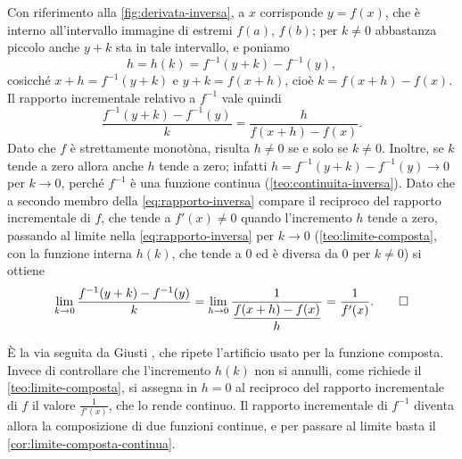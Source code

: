 \begin{dimostrazione}
Con riferimento alla \cref{fig:derivata-inversa}, a $x$ corrisponde $y=f(x)$, che è
interno all'intervallo immagine di estremi $f(a)$, $f(b)$; per $k\neq0$ abbastanza
piccolo anche $y+k$ sta in tale intervallo, e poniamo
\[
  h=h(k)=f^{-1}(y+k)-f^{-1}(y),
\]
cosicché $x+h=f^{-1}(y+k)$ e $y+k=f(x+h)$, cioè $k=f(x+h)-f(x)$. Il rapporto incrementale
relativo a $f^{-1}$ vale quindi
\begin{equation}\label{eq:rapporto-inversa}
  \frac{f^{-1}(y+k)-f^{-1}(y)}{k}=\frac{h}{f(x+h)-f(x)} .
\end{equation}
Dato che $f$ è strettamente monotòna, risulta $h\neq0$ se e solo se $k\neq0$. Inoltre, se
$k$ tende a zero allora anche $h$ tende a zero; infatti
$h=f^{-1}(y+k)-f^{-1}(y)\to0$ per $k\to0$, perché $f^{-1}$ è una funzione continua
(\cref{teo:continuita-inversa}). Dato che a secondo membro della
\eqref{eq:rapporto-inversa} compare il reciproco del rapporto incrementale di $f$, che
tende a $f'(x)\neq0$ quando l'incremento $h$ tende a zero, passando al limite nella
\eqref{eq:rapporto-inversa} per $k\to0$ (\cref{teo:limite-composta}, con la funzione
interna $h(k)$, che tende a $0$ ed è diversa da $0$ per $k\neq0$) si ottiene
\[
  \lim_{k\to0}\frac{f^{-1}(y+k)-f^{-1}(y)}{k}=\lim_{h\to0}\frac1{\dfrac{f(x+h)-f(x)}{h}}=\frac1{f'(x)}. \qedhere
\]
\end{dimostrazione}

\begin{strategia}
È la via seguita da Giusti \cite{giusti}, che ripete l'artificio usato per la funzione
composta. Invece di controllare che l'incremento $h(k)$ non si annulli, come richiede il
\cref{teo:limite-composta}, si assegna in $h=0$ al reciproco del rapporto incrementale di
$f$ il valore $\frac1{f'(x)}$, che lo rende continuo. Il rapporto incrementale di
$f^{-1}$ diventa allora la composizione di due funzioni continue, e per passare al limite
basta il \cref{cor:limite-composta-continua}.
\end{strategia}

